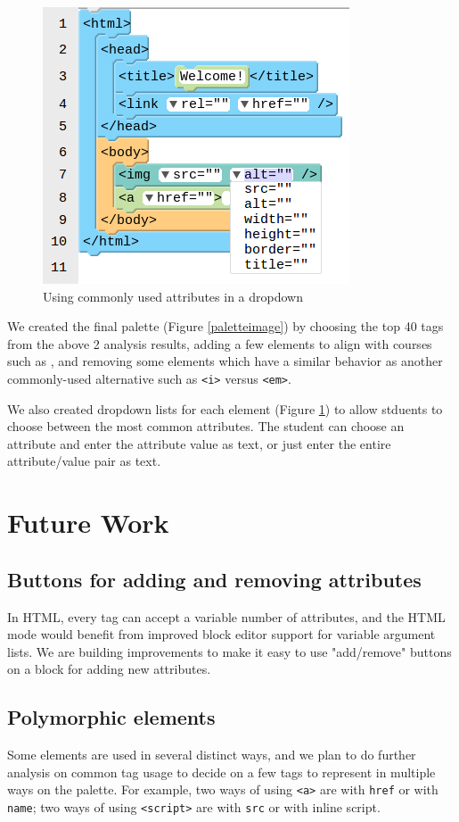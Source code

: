 \documentclass[conference]{IEEEtran}
\begin{document}
\begin{figure}
\centering
\includegraphics[width=0.5\columnwidth]{dropdown.png}
\caption{Using commonly used attributes in a dropdown}
\label{dropdownimage}
\end{figure}

We created the final palette (Figure \ref{paletteimage}) by choosing the top 40 tags from the above 2 analysis results, adding a few elements to align with courses such as \cite{htmltutor1} \cite{htmltutor2} \cite{htmltutor3}, and removing some elements which have a similar behavior as another commonly-used alternative such as \texttt{<i>} versus \texttt{<em>}.

We also created dropdown lists for each element (Figure \ref{dropdownimage}) to allow stduents to choose between the most common attributes.  The student can choose an attribute and enter the attribute value as text, or just enter the entire attribute/value pair as text.

\section{Future Work}

\subsection{Buttons for adding and removing attributes}
In HTML, every tag can accept a variable number of attributes, and the HTML mode would benefit from improved block editor support for variable argument lists.  We are building improvements to make it easy to use "add/remove" buttons on a block for adding new attributes.

\subsection{Polymorphic elements}
Some elements are used in several distinct ways, and we plan to do further analysis on common tag usage to decide on a few tags to represent in multiple ways on the palette.  For example, two ways of using \texttt{<a>} are with \texttt{href} or with \texttt{name}; two ways of using \texttt{<script>} are with \texttt{src} or with inline script.
\end{document}
